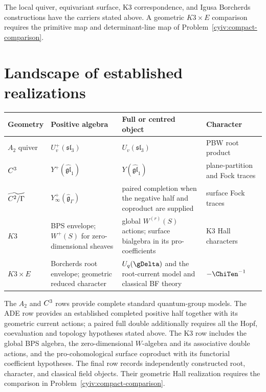 The local quiver, equivariant surface, K3 correspondence, and Igusa Borcherds constructions have the carriers stated above.
A geometric $K3\times E$ comparison requires the primitive map and determinant-line map of Problem~\ref{cyiv:compact-comparison}.

\section{Landscape of established realizations}
\begin{center}
\footnotesize
\begin{tabularx}{0.99\textwidth}{@{}>{\raggedright\arraybackslash}p{}>{\raggedright\arraybackslash}p{}>{\raggedright\arraybackslash}X>{\raggedright\arraybackslash}p{}@{}}
\toprule
\textbf{Geometry}&\textbf{Positive algebra}&\textbf{Full or centred object}&\textbf{Character}\\
\midrule
$A_2$ quiver&$U_v^+(\mathfrak{sl}_3)$&$U_v(\mathfrak{sl}_3)$&PBW root product\\
$C^3$&$Y^+(\widehat{\mathfrak{gl}}_1)$&$Y(\widehat{\mathfrak{gl}}_1)$&plane-partition and Fock traces\\
$\widetilde{C^2/\Gamma}$&$Y^+_\infty(\widehat{\mathfrak g}_\Gamma)$&paired completion when the negative half and coproduct are supplied&surface Fock traces\\
$K3$&BPS envelope; $W^+(S)$ for zero-dimensional sheaves&global
$W^{(r)}(S)$ actions; surface bialgebra in its pro-coefficients&K3 Hall characters\\
$K3\times E$&Borcherds root envelope; geometric reduced character&$U_q(\gDelta)$ and the root-current model and classical BF theory&$-\ChiTen^{-1}$\\
\bottomrule
\end{tabularx}
\end{center}
The $A_2$ and $C^3$ rows provide complete standard quantum-group models. The ADE row provides an established completed positive half together with its geometric current actions; a paired full double additionally requires all the Hopf, coevaluation and topology hypotheses stated above. The K3 row includes the global BPS algebra, the zero-dimensional
$W$-algebra and its associative double actions, and the pro-cohomological
surface coproduct with its functorial coefficient hypotheses. The final row records independently constructed root, character, and classical field objects.
Their geometric Hall realization requires the comparison in Problem~\ref{cyiv:compact-comparison}.

